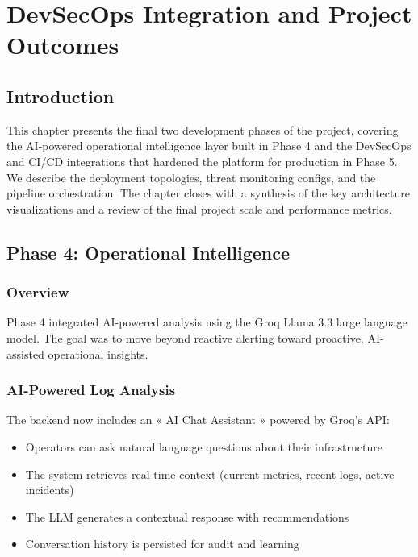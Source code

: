 \documentclass[12pt,a4paper]{report}
\begin{document}
\newpage

\chapter{DevSecOps Integration and Project Outcomes}

\section*{Introduction}
This chapter presents the final two development phases of the project, covering the AI-powered operational intelligence layer built in Phase 4 and the DevSecOps and CI/CD integrations that hardened the platform for production in Phase 5. We describe the deployment topologies, threat monitoring configs, and the pipeline orchestration. The chapter closes with a synthesis of the key architecture visualizations and a review of the final project scale and performance metrics.

\section{Phase 4: Operational Intelligence}

\subsection{Overview}

Phase 4 integrated AI-powered analysis using the Groq Llama 3.3 large language model. The goal was to move beyond reactive alerting toward proactive, AI-assisted operational insights.

\subsection{AI-Powered Log Analysis}

The backend now includes an « AI Chat Assistant » powered by Groq's API:

\begin{itemize}
  \item Operators can ask natural language questions about their infrastructure
  \item The system retrieves real-time context (current metrics, recent logs, active incidents)
  \item The LLM generates a contextual response with recommendations
  \item Conversation history is persisted for audit and learning
\end{itemize}
\end{document}
